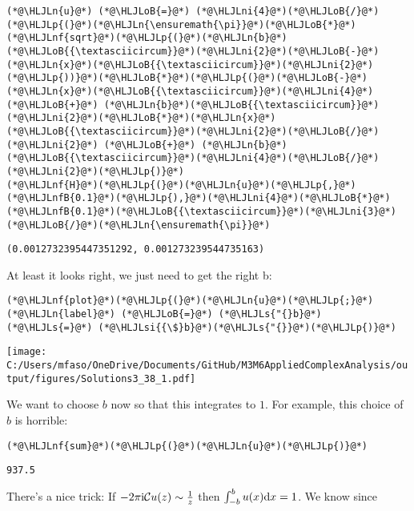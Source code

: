 \documentclass[12pt,landscape]{article}
\newcommand{\HLJLn}[1]{#1}
\newcommand{\HLJLnf}[1]{\textcolor[RGB]{66,102,213}{#1}}
\newcommand{\HLJLs}[1]{\textcolor[RGB]{201,61,57}{#1}}
\newcommand{\HLJLsi}[1]{#1}
\newcommand{\HLJLnfB}[1]{\textcolor[RGB]{59,151,46}{#1}}
\newcommand{\HLJLni}[1]{\textcolor[RGB]{59,151,46}{#1}}
\newcommand{\HLJLoB}[1]{\textcolor[RGB]{102,102,102}{\textbf{#1}}}
\newcommand{\HLJLp}[1]{#1}
\def\D{ {\rm d} }
\def\I{ {\rm i} }
\def\CC{ {\cal C} }
\def\dx{\D x}
\begin{document}
{\begin{lstlisting}
(*@\HLJLn{u}@*) (*@\HLJLoB{=}@*) (*@\HLJLni{4}@*)(*@\HLJLoB{/}@*)(*@\HLJLp{(}@*)(*@\HLJLn{\ensuremath{\pi}}@*)(*@\HLJLoB{*}@*)(*@\HLJLnf{sqrt}@*)(*@\HLJLp{(}@*)(*@\HLJLn{b}@*)(*@\HLJLoB{{\textasciicircum}}@*)(*@\HLJLni{2}@*)(*@\HLJLoB{-}@*)(*@\HLJLn{x}@*)(*@\HLJLoB{{\textasciicircum}}@*)(*@\HLJLni{2}@*)(*@\HLJLp{))}@*)(*@\HLJLoB{*}@*)(*@\HLJLp{(}@*)(*@\HLJLoB{-}@*)(*@\HLJLn{x}@*)(*@\HLJLoB{{\textasciicircum}}@*)(*@\HLJLni{4}@*) (*@\HLJLoB{+}@*) (*@\HLJLn{b}@*)(*@\HLJLoB{{\textasciicircum}}@*)(*@\HLJLni{2}@*)(*@\HLJLoB{*}@*)(*@\HLJLn{x}@*)(*@\HLJLoB{{\textasciicircum}}@*)(*@\HLJLni{2}@*)(*@\HLJLoB{/}@*)(*@\HLJLni{2}@*) (*@\HLJLoB{+}@*) (*@\HLJLn{b}@*)(*@\HLJLoB{{\textasciicircum}}@*)(*@\HLJLni{4}@*)(*@\HLJLoB{/}@*)(*@\HLJLni{2}@*)(*@\HLJLp{)}@*)
(*@\HLJLnf{H}@*)(*@\HLJLp{(}@*)(*@\HLJLn{u}@*)(*@\HLJLp{,}@*) (*@\HLJLnfB{0.1}@*)(*@\HLJLp{),}@*)(*@\HLJLni{4}@*)(*@\HLJLoB{*}@*)(*@\HLJLnfB{0.1}@*)(*@\HLJLoB{{\textasciicircum}}@*)(*@\HLJLni{3}@*)(*@\HLJLoB{/}@*)(*@\HLJLn{\ensuremath{\pi}}@*)
\end{lstlisting}

\begin{lstlisting}
(0.0012732395447351292, 0.001273239544735163)
\end{lstlisting}


At least it looks right, we just need to get the right b:


\begin{lstlisting}
(*@\HLJLnf{plot}@*)(*@\HLJLp{(}@*)(*@\HLJLn{u}@*)(*@\HLJLp{;}@*) (*@\HLJLn{label}@*) (*@\HLJLoB{=}@*) (*@\HLJLs{"{}b}@*) (*@\HLJLs{=}@*) (*@\HLJLsi{{\$}b}@*)(*@\HLJLs{"{}}@*)(*@\HLJLp{)}@*)
\end{lstlisting}

\texttt{[image: C:/Users/mfaso/OneDrive/Documents/GitHub/M3M6AppliedComplexAnalysis/output/figures/Solutions3\_38\_1.pdf]}

We want to choose $b$ now so that this integrates to $1$. For example, this choice of $b$ is horrible:


\begin{lstlisting}
(*@\HLJLnf{sum}@*)(*@\HLJLp{(}@*)(*@\HLJLn{u}@*)(*@\HLJLp{)}@*)
\end{lstlisting}

\begin{lstlisting}
937.5
\end{lstlisting}


There's a nice trick: If $-2\pi \I \CC u(z) \sim {1 \over  z}$ then $\int_{-b}^b u(x) \dx  = 1$.  We know since

}
\end{document}
